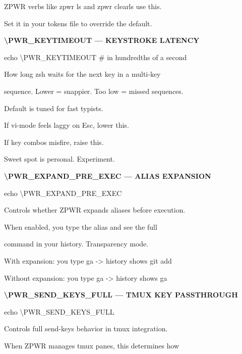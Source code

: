 \documentclass[11pt,a4paper,twoside]{book}
\begin{document}
\begin{codebox}
ZPWR verbs like zpwr ls and zpwr clearls use this.\\
\end{codebox}

Set it in your tokens file to override the default.


\vspace{12pt}
{\bfseries\color{neonyellow} \textbackslash{}PWR\_KEYTIMEOUT — KEYSTROKE LATENCY}\vspace{4pt}

echo \textbackslash{}PWR\_KEYTIMEOUT   \# in hundredths of a second

How long zsh waits for the next key in a multi-key

sequence. Lower = snappier. Too low = missed sequences.

Default is tuned for fast typists.

If vi-mode feels laggy on Esc, lower this.

If key combos misfire, raise this.

Sweet spot is personal. Experiment.


\vspace{12pt}
{\bfseries\color{neonyellow} \textbackslash{}PWR\_EXPAND\_PRE\_EXEC — ALIAS EXPANSION}\vspace{4pt}

echo \textbackslash{}PWR\_EXPAND\_PRE\_EXEC

Controls whether ZPWR expands aliases before execution.

When enabled, you type the alias and see the full

command in your history. Transparency mode.

\begin{codebox}
With expansion:    you type ga  -> history shows git add\\
\end{codebox}

Without expansion: you type ga  -> history shows ga


\vspace{12pt}
{\bfseries\color{neonyellow} \textbackslash{}PWR\_SEND\_KEYS\_FULL — TMUX KEY PASSTHROUGH}\vspace{4pt}

echo \textbackslash{}PWR\_SEND\_KEYS\_FULL

Controls full send-keys behavior in tmux integration.

When ZPWR manages tmux panes, this determines how
\end{document}
